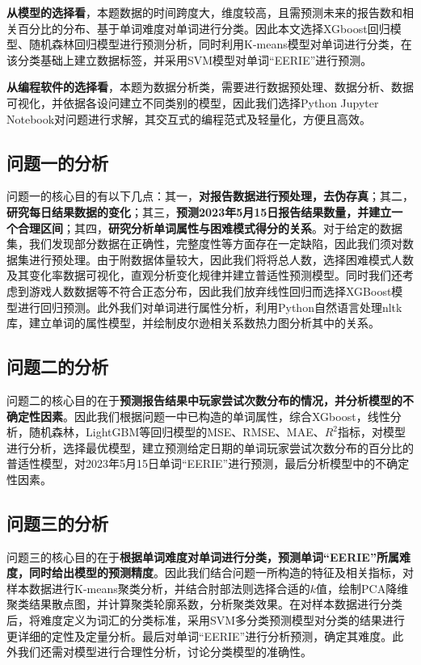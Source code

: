 \documentclass{MathModeling}
\begin{document}
	\textbf{从模型的选择看}，本题数据的时间跨度大，维度较高，且需预测未来的报告数和相关百分比的分布、基于单词难度对单词进行分类。因此本文选择XGboost回归模型、随机森林回归模型进行预测分析，同时利用K-means模型对单词进行分类，在该分类基础上建立数据标签，并采用SVM模型对单词“EERIE”进行预测。

	\textbf{从编程软件的选择看}，本题为数据分析类，需要进行数据预处理、数据分析、数据可视化，并依据各设问建立不同类别的模型，因此我们选择Python Jupyter Notebook对问题进行求解，其交互式的编程范式及轻量化，方便且高效。
	
	\subsection{问题一的分析}
	问题一的核心目的有以下几点：{\heiti 其一}，\textbf{对报告数据进行预处理，去伪存真}；{\heiti 其二}，\textbf{研究每日结果数据的变化}；{\heiti 其三}，\textbf{预测2023年5月15日报告结果数量，并建立一个合理区间}；{\heiti 其四}，\textbf{研究分析单词属性与困难模式得分的关系}。对于给定的数据集，我们发现部分数据在正确性，完整度性等方面存在一定缺陷，因此我们须对数据集进行预处理。由于附数据体量较大，因此我们将将总人数，选择困难模式人数及其变化率数据可视化，直观分析变化规律并建立普适性预测模型。同时我们还考虑到游戏人数数据等不符合正态分布，因此我们放弃线性回归而选择XGBoost模型进行回归预测。此外我们对单词进行属性分析，利用Python自然语言处理nltk库，建立单词的属性模型，并绘制皮尔逊相关系数热力图分析其中的关系。

	\subsection{问题二的分析}
	问题二的核心目的在于\textbf{预测报告结果中玩家尝试次数分布的情况，并分析模型的不确定性因素}。因此我们根据问题一中已构造的单词属性，综合XGboost，线性分析，随机森林，LightGBM等回归模型的MSE、RMSE、MAE、$R^2$指标，对模型进行分析，选择最优模型，建立预测给定日期的单词玩家尝试次数分布的百分比的普适性模型，对2023年5月15日单词“EERIE”进行预测，最后分析模型中的不确定性因素。

	\subsection{问题三的分析}
	问题三的核心目的在于\textbf{根据单词难度对单词进行分类，预测单词“EERIE”所属难度，同时给出模型的预测精度}。因此我们结合问题一所构造的特征及相关指标，对样本数据进行K-means聚类分析，并结合肘部法则选择合适的$k$值，绘制PCA降维聚类结果散点图，并计算聚类轮廓系数，分析聚类效果。在对样本数据进行分类后，将难度定义为词汇的分类标准，采用SVM多分类预测模型对分类的结果进行更详细的定性及定量分析。最后对单词“EERIE”进行分析预测，确定其难度。此外我们还需对模型进行合理性分析，讨论分类模型的准确性。
\end{document}
